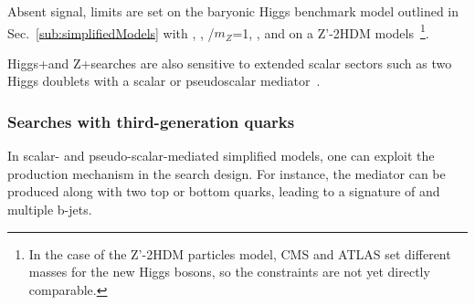Absent signal, limits are set on the baryonic Higgs benchmark model outlined in Sec.~\ref{sub:simplifiedModels} with  , , \ghZprimeZprime/$m_{Z}$=1, , 
and on a Z'-2HDM models~\footnote{ In the case of the Z'-2HDM particles model, CMS and ATLAS set different masses for the new Higgs bosons, 
so the constraints are not yet directly comparable.}.

Higgs+\MET and Z+\MET searches are also sensitive to extended scalar sectors such as two Higgs doublets with a scalar or pseudoscalar mediator~\cite{Bauer:2017ota,Goncalves:2016iyg,Bell:2016ekl}.

\subsubsection{Searches with third-generation quarks}


In scalar- and pseudo-scalar-mediated simplified models, one can exploit the production mechanism in the search design. For instance, the mediator can be produced along with two top or bottom quarks, leading to a signature of \MET and multiple b-jets.

